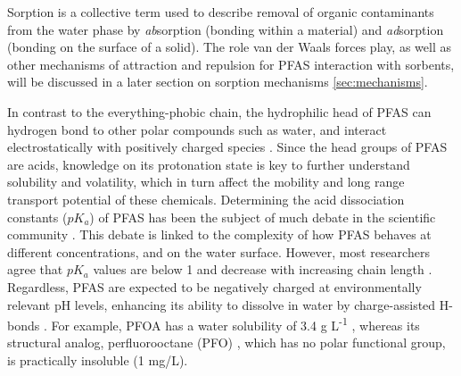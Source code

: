 Sorption is a collective term used to describe removal of organic contaminants from the water phase by \textit{ab}sorption (bonding within a material) and \textit{ad}sorption (bonding on the surface of a solid). The role van der Waals forces play, as well as other mechanisms of attraction and repulsion for PFAS interaction with sorbents, will be discussed in a later section on sorption mechanisms \cref{sec:mechanisms}. 

In contrast to the everything-phobic chain, the hydrophilic head of PFAS can hydrogen bond to other polar compounds such as water, and interact electrostatically with positively charged species \citep{sigmund2022sorption}. Since the head groups of PFAS are acids, knowledge on its protonation state is key to further understand solubility and volatility, which in turn affect the mobility and long range transport potential of these chemicals. Determining the acid dissociation constants (\(pK_a\)) of PFAS has been the subject of much debate in the scientific community \citep{Goss2009comment}. This debate is linked to the complexity of how PFAS behaves at different concentrations, and on the water surface. However, most researchers agree that \(pK_a\) values are below 1 and decrease with increasing chain length \citep{wang2011physchem,Reemtsma2016}. Regardless, PFAS are expected to be negatively charged at environmentally relevant pH levels, enhancing its ability to dissolve in water by charge-assisted H- bonds \citep{Reemtsma2016}. For example, PFOA has a water solubility of 3.4 g L\textsuperscript{-1} \citep{PFOA}, whereas its structural analog, perfluorooctane (PFO) \citep{PFO}, which has no polar functional group, is practically insoluble (1 mg/L). 

